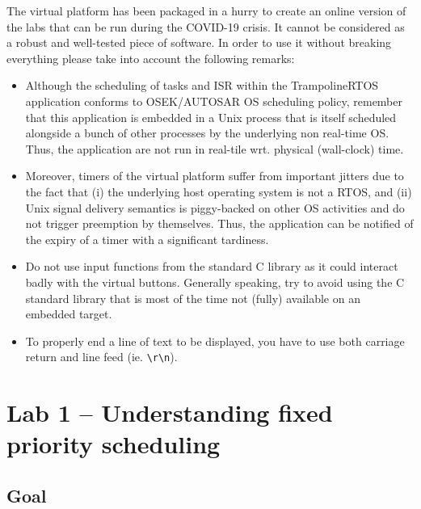 \documentclass[11pt]{report}
\begin{document}
The virtual platform has been packaged in a hurry to create an online version of the labs that can be run during the COVID-19 crisis.
It cannot be considered as a robust and well-tested piece of software.
In order to use it without breaking everything please take into account the following remarks:

\begin{itemize}
  \item
    Although the scheduling of tasks and ISR within the TrampolineRTOS application conforms to OSEK/AUTOSAR OS scheduling policy, remember that this application is embedded in a Unix process that is itself scheduled alongside a bunch of other processes by the underlying non real-time OS.
    Thus, the application are not run in real-tile wrt. physical (wall-clock) time.

  \item
    Moreover, timers of the virtual platform suffer from important jitters due to the fact that (i) the underlying host operating system is not a RTOS, and (ii) Unix signal delivery semantics is piggy-backed on other OS activities and do not trigger preemption by themselves.
    Thus, the application can be notified of the expiry of a timer with a significant tardiness.

  \item
    Do not use input functions from the standard C library as it could interact badly with the virtual buttons.
    Generally speaking, try to avoid using the C standard library that is most of the time not (fully) available on an embedded target.

  \item
    To properly end a line of text to be displayed, you have to use both carriage return and line feed (ie. \verb|\r\n|).
\end{itemize}



\chapter{Lab 1 -- Understanding fixed priority scheduling}

\section{Goal}
\end{document}
